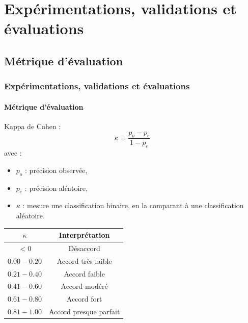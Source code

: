 \documentclass{beamer}
\begin{document}
	\section{Expérimentations, validations et évaluations}
		\subsection{Métrique d'évaluation}
			\begin{frame}
				\frametitle{Expérimentations, validations et évaluations}
				\framesubtitle{Métrique d'évaluation}
				Kappa de Cohen :
				\begin{equation*}
					\kappa = \frac{p_o - p_e}{1 - p_e}
				\end{equation*}
				avec :
				\begin{itemize}
					\item $p_o$ : précision observée,
					\item $p_e$ : précision aléatoire,
					\item $\kappa$ : mesure une classification binaire, en la comparant à une classification aléatoire.
				\end{itemize}
				\begin{table}
					\centering
					\begin{tabular}{|c|c|}
						\hline
						$\kappa$ & Interprétation \\
						\hline
						$< 0$ & Désaccord \\
						\hline
						$0.00 - 0.20$ & Accord très faible \\
						\hline
						$0.21 - 0.40$ & Accord faible \\
						\hline
						$0.41 - 0.60$ & Accord modéré \\
						\hline
						$0.61 - 0.80$ & Accord fort \\
						\hline
						$0.81 - 1.00$ & Accord presque parfait \\
						\hline
					\end{tabular}
				\end{table}
			\end{frame}
\end{document}
